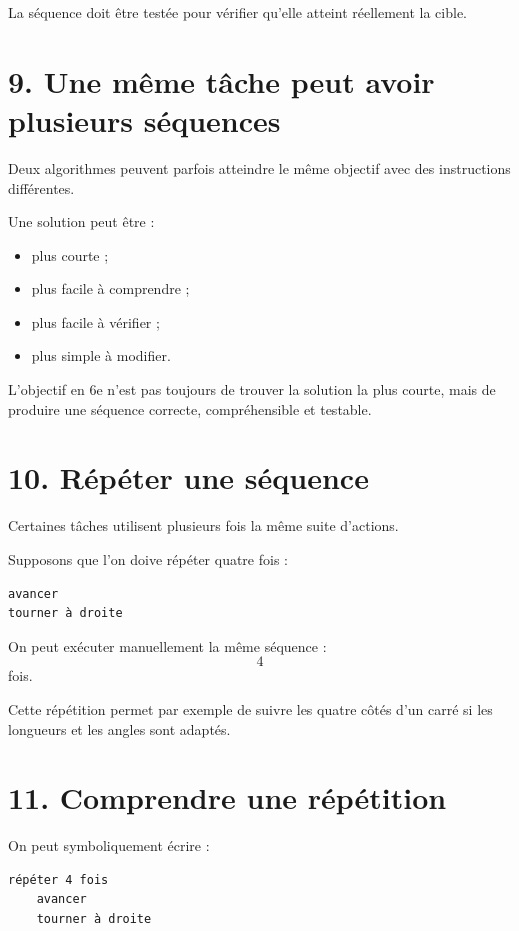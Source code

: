 La séquence doit être testée pour vérifier qu'elle atteint réellement la cible.

\section{9. Une même tâche peut avoir plusieurs séquences}

Deux algorithmes peuvent parfois atteindre le même objectif avec des instructions différentes.

Une solution peut être :
\begin{itemize}
\item plus courte ;
\item plus facile à comprendre ;
\item plus facile à vérifier ;
\item plus simple à modifier.
\end{itemize}

L'objectif en 6e n'est pas toujours de trouver la solution la plus courte, mais de produire une séquence correcte, compréhensible et testable.

\section{10. Répéter une séquence}

Certaines tâches utilisent plusieurs fois la même suite d'actions.

Supposons que l'on doive répéter quatre fois :
\begin{verbatim}
avancer
tourner à droite
\end{verbatim}

On peut exécuter manuellement la même séquence :
\[
4
\]
fois.

Cette répétition permet par exemple de suivre les quatre côtés d'un carré si les longueurs et les angles sont adaptés.

\section{11. Comprendre une répétition}


On peut symboliquement écrire :
\begin{verbatim}
répéter 4 fois
    avancer
    tourner à droite
\end{verbatim}

